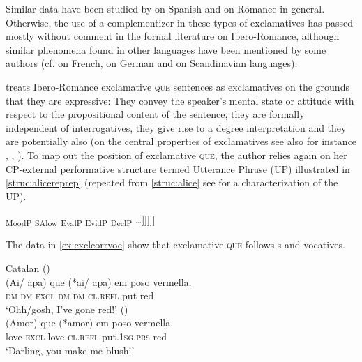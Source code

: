 Similar data have been studied by \citet{Biezma2008} on Spanish and \citet{Ledgeway2012} on Romance in general. Otherwise, the use of a complementizer in these types of exclamatives  has passed  mostly without comment in the formal literature  on  Ibero-Romance, although similar phenomena  found in other languages have been mentioned by some authors (cf. \citealt{Saeboe2005} on French,  \citealt{Schwabe2006} on German and  \citealt{Delsing2010} on Scandinavian languages). 

 \citet{Corr2016} treats Ibero-Romance exclamative \textsc{que} sentences as  exclamatives on the grounds that they are expressive: They convey the speaker's mental state or attitude with respect to the propositional content of the sentence, they are formally independent of interrogatives, they give rise to a degree interpretation and they  are potentially also  (on the central properties of exclamatives see also for instance \citealt{Gutierrez-Rexach2001}, \citealt{Zanuttini2003}, \citealt{Castroviejo2006}). 
To map out the position of exclamative \textsc{que}, the author relies again on her CP-external performative structure termed Utterance Phrase (UP) illustrated in \eqref{struc:alicereprep} (repeated from \eqref{struc:alice} see  for a characterization of the UP). 

\ea \label{struc:alicereprep} {\ob}\textsubscript{MoodP}  {\ob}\textsubscript{SAlow}  {\ob}\textsubscript{EvalP} {\ob}\textsubscript{EvidP} {\ob}\textsubscript{DeclP} \dots ]]]]]
\z 

The data in \eqref{ex:exclcorrvoc} show that exclamative \textsc{que} follows s and vocatives. 

\ea Catalan \label{ex:exclcorrvoc}
\ea
 (\citealt[132: ex 118]{Corr2016})\\
\gll  (Ai/ apa) que (*ai/ apa) em poso vermella. \\
\textsc{dm} \textsc{dm} \textsc{excl} \textsc{dm} \textsc{dm} \textsc{cl.refl} put red\\
\glt `Ohh/gosh, I've gone red!' 
\ex (\citealt[134: ex 122]{Corr2016})\\

\gll (Amor) que (*amor) em poso vermella. \\
love \textsc{excl} love \textsc{cl.refl} put.\textsc{1sg.prs} red\\
\glt `Darling, you make me blush!' 
\z
\z

